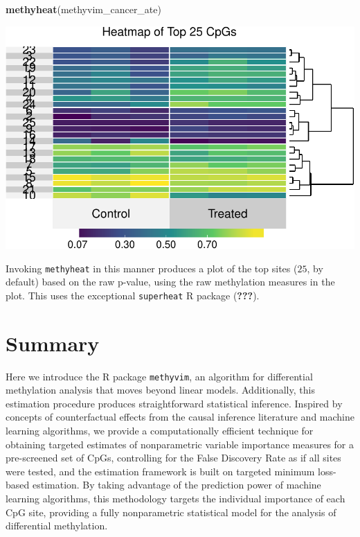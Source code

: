 \documentclass[9pt,a4paper,]{extarticle}
\newenvironment{Shaded}{\begin{snugshade}}{\end{snugshade}}
\newcommand{\KeywordTok}[1]{\textcolor[rgb]{0.13,0.29,0.53}{\textbf{#1}}}
\newcommand{\NormalTok}[1]{#1}
\theoremstyle{definition}
\theoremstyle{definition}
\theoremstyle{definition}
\theoremstyle{remark}
\begin{document}
\begin{Shaded}
\begin{Highlighting}[]
\KeywordTok{methyheat}\NormalTok{(methyvim_cancer_ate)}
\end{Highlighting}
\end{Shaded}

\includegraphics{paper_BiocF1000_files/figure-latex/methyvim-heatmap-1.pdf}

Invoking \texttt{methyheat} in this manner produces a plot of the top
sites (\(25\), by default) based on the raw p-value, using the raw
methylation measures in the plot. This uses the exceptional
\texttt{superheat} R package ({\textbf{???}}).

\section{Summary}\label{summary}

Here we introduce the R package \texttt{methyvim}, an algorithm for
differential methylation analysis that moves beyond linear models.
Additionally, this estimation procedure produces straightforward
statistical inference. Inspired by concepts of counterfactual effects
from the causal inference literature and machine learning algorithms, we
provide a computationally efficient technique for obtaining targeted
estimates of nonparametric variable importance measures for a
pre-screened set of CpGs, controlling for the False Discovery Rate as if
all sites were tested, and the estimation framework is built on targeted
minimum loss-based estimation. By taking advantage of the prediction
power of machine learning algorithms, this methodology targets the
individual importance of each CpG site, providing a fully nonparametric
statistical model for the analysis of differential methylation.
\end{document}
